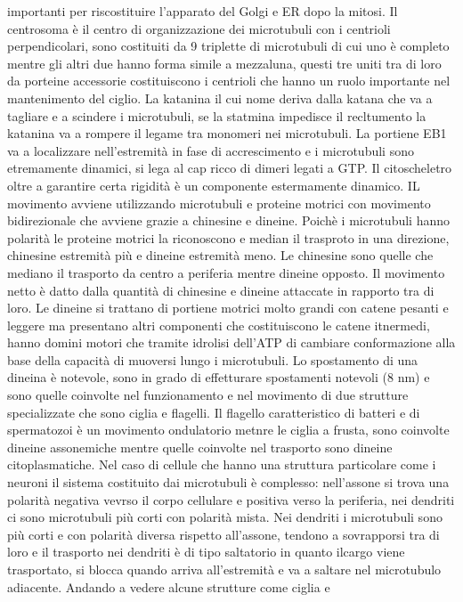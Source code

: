 importanti per riscostituire l'apparato del Golgi e ER dopo la mitosi. Il centrosoma \`e il centro di organizzazione dei microtubuli con i centrioli perpendicolari, sono costituiti da 
9 triplette di microtubuli di cui uno \`e completo mentre gli altri due hanno forma simile a mezzaluna, questi tre uniti tra di loro da porteine accessorie costituiscono i centrioli
che hanno un ruolo importante nel mantenimento del ciglio. La katanina il cui nome deriva dalla katana che va a tagliare e a scindere i microtubuli, se la statmina impedisce il
recltumento la katanina va a rompere il legame tra monomeri nei microtubuli. La portiene EB1 va a localizzare nell'estremit\`a in fase di accrescimento e i microtubuli sono etremamente
dinamici, si lega al cap ricco di dimeri legati a GTP. Il citoscheletro oltre a garantire certa rigidit\`a \`e un componente estermamente dinamico. IL movimento avviene utilizzando 
microtubuli e proteine motrici con movimento bidirezionale che avviene grazie a chinesine e dineine. Poich\`e i microtubuli hanno polarit\`a le proteine motrici la riconoscono e median
il trasproto in una direzione, chinesine estremit\`a pi\`u e dineine estremit\`a meno. Le chinesine sono quelle che mediano il trasporto da centro a periferia mentre dineine opposto. 
Il movimento netto \`e datto dalla quantit\`a di chinesine e dineine attaccate in rapporto tra di loro. Le dineine si trattano di portiene motrici molto grandi con catene pesanti e 
leggere ma presentano altri componenti che costituiscono le catene itnermedi, hanno domini motori che tramite idrolisi dell'ATP di cambiare conformazione alla base della capacit\`a di 
muoversi lungo i microtubuli. Lo spostamento di una dineina \`e notevole, sono in grado di effetturare spostamenti notevoli ($8$ nm) e sono quelle coinvolte nel funzionamento e nel 
movimento di due strutture specializzate che sono ciglia e flagelli. Il flagello caratteristico di batteri e di spermatozoi \`e un movimento ondulatorio metnre le ciglia a frusta, sono
coinvolte dineine assonemiche mentre quelle coinvolte nel trasporto sono dineine citoplasmatiche. Nel caso di cellule che hanno una struttura particolare come i neuroni il sistema 
costituito dai microtubuli \`e complesso: nell'assone si trova una polarit\`a negativa vevrso il corpo cellulare e positiva verso la periferia, nei dendriti ci sono microtubuli pi\`u 
corti con polarit\`a mista. Nei dendriti i microtubuli sono pi\`u corti e con polarit\`a diversa rispetto all'assone, tendono a sovrapporsi tra di loro e il trasporto nei dendriti \`e di
tipo saltatorio in quanto ilcargo viene trasportato, si blocca quando arriva all'estremit\`a e va a saltare nel microtubulo adiacente. Andando a vedere alcune strutture come ciglia e 
